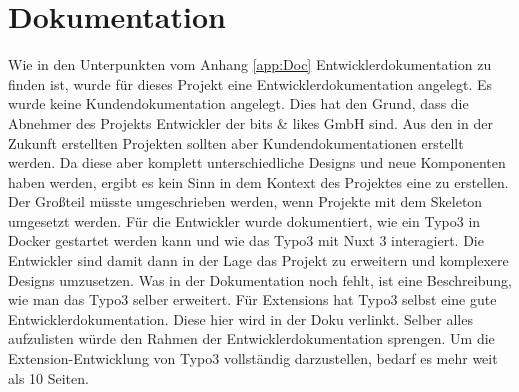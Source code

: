 \section{Dokumentation}
\label{sec:Dokumentation}

Wie in den Unterpunkten vom Anhang \ref{app:Doc} Entwicklerdokumentation zu finden ist, wurde für dieses Projekt eine Entwicklerdokumentation angelegt. Es wurde keine Kundendokumentation angelegt. Dies hat den Grund, dass die Abnehmer des Projekts Entwickler der bits \& likes GmbH sind. Aus den in der Zukunft erstellten Projekten sollten aber Kundendokumentationen erstellt werden. Da diese aber komplett unterschiedliche Designs und neue Komponenten haben werden, ergibt es kein Sinn in dem Kontext des Projektes eine zu erstellen. Der Großteil müsste umgeschrieben werden, wenn Projekte mit dem Skeleton umgesetzt werden. Für die Entwickler wurde dokumentiert, wie ein Typo3 in Docker gestartet werden kann und wie das Typo3 mit Nuxt 3 interagiert. Die Entwickler sind damit dann in der Lage das Projekt zu erweitern und komplexere Designs umzusetzen. Was in der Dokumentation noch fehlt, ist eine Beschreibung, wie man das Typo3 selber erweitert. Für Extensions hat Typo3 selbst eine gute Entwicklerdokumentation. Diese hier wird in der Doku verlinkt. Selber alles aufzulisten würde den Rahmen der Entwicklerdokumentation sprengen. Um die Extension-Entwicklung von Typo3 vollständig darzustellen, bedarf es mehr weit als 10 Seiten.